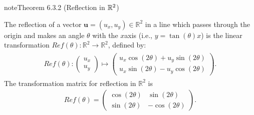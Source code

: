 \documentclass[letterpaper,10pt,english]{jupyterBook}
\begin{document}
\begin{sphinxadmonition}{note}{Theorem 6.3.2 (Reflection in \protect\(\mathbb{R}^2\protect\))}



\sphinxAtStartPar
The reflection of a vector \(\mathbf{u} = (u_x, u_y) \in \mathbb{R}^2\) in a line which passes through the origin and makes an angle \(\theta\) with the \(x\)\sphinxhyphen{}axis (i.e., \(y = \tan(\theta)x\)) is the linear transformation \(Re\!f(\theta) : \mathbb{R}^2 \to \mathbb{R}^2\), defined by:
\begin{equation*}
\begin{split} \begin{align*}
    Re\!f(\theta) :
    \begin{pmatrix} u_x \\ u_y \end{pmatrix} \mapsto
    \begin{pmatrix} u_x \cos (2\theta) + u_y \sin(2 \theta) \\ u_x \sin(2\theta) - u_y \cos (2\theta) \end{pmatrix}.
\end{align*} \end{split}
\end{equation*}
\sphinxAtStartPar
The transformation matrix for reflection in \(\mathbb{R}^2\) is
\begin{equation}\label{equation:_pages/6.3_Rotation_reflection_and_translation:reflection-matrix-equation}
\begin{split} Re\!f(\theta) =
\begin{pmatrix}
    \cos(2\theta) & \sin(2 \theta) \\
    \sin(2\theta) & -\cos(2\theta)
\end{pmatrix}. \end{split}
\end{equation}\end{sphinxadmonition}
\end{document}
